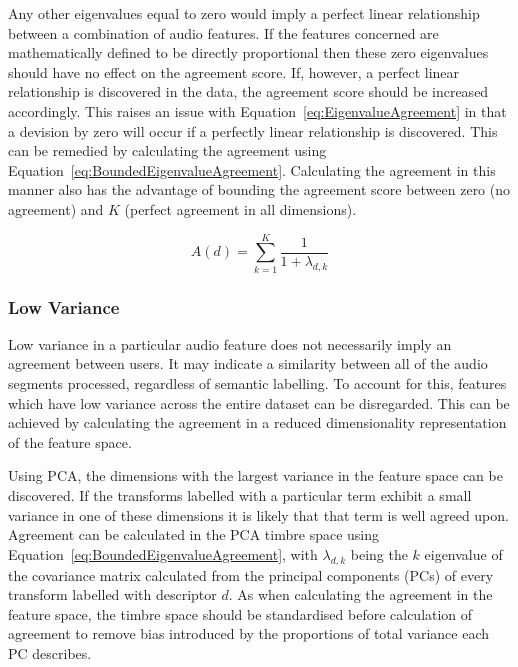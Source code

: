 			Any other eigenvalues equal to zero would imply a perfect linear relationship between a combination
			of audio features. If the features concerned are mathematically defined to be directly proportional
			then these zero eigenvalues should have no effect on the agreement score. If, however, a perfect
			linear relationship is discovered in the data, the agreement score should be increased
			accordingly. This raises an issue with Equation~\ref{eq:EigenvalueAgreement} in that a devision by
			zero will occur if a perfectly linear relationship is discovered. This can be remedied by
			calculating the agreement using Equation~\ref{eq:BoundedEigenvalueAgreement}. Calculating the
			agreement in this manner also has the advantage of bounding the agreement score between zero (no
			agreement) and $K$ (perfect agreement in all dimensions).

			\begin{equation}
				A(d) = \sum_{k = 1}^{K} \frac{1}{1 + \lambda_{d,k}}
				\label{eq:BoundedEigenvalueAgreement}
			\end{equation}

		\subsubsection*{Low Variance}
			Low variance in a particular audio feature does not necessarily imply an agreement between users.
			It may indicate a similarity between all of the audio segments processed, regardless of semantic
			labelling. To account for this, features which have low variance across the entire dataset can be
			disregarded. This can be achieved by calculating the agreement in a reduced dimensionality
			representation of the feature space.

			Using PCA, the dimensions with the largest variance in the feature space can be discovered. If the
			transforms labelled with a particular term exhibit a small variance in one of these dimensions it
			is likely that that term is well agreed upon. Agreement can be calculated in the PCA timbre space
			using Equation~\ref{eq:BoundedEigenvalueAgreement}, with $\lambda_{d,k}$ being the $k$
			eigenvalue of the covariance matrix calculated from the principal components (PCs) of every
			transform labelled with descriptor $d$. As when calculating the agreement in the feature space, the
			timbre space should be standardised before calculation of agreement to remove bias introduced by
			the proportions of total variance each PC describes.

